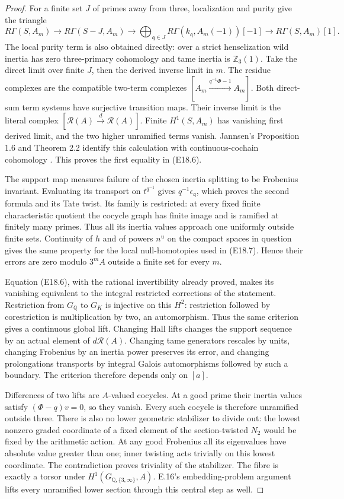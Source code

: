 \begin{proof}
For a finite set $J$ of primes away from three,
localization and purity give the triangle
\[
 R\Gamma(S,A_m)\longrightarrow
 R\Gamma(S-J,A_m)\longrightarrow
 \bigoplus_{\mathfrak q\in J}
 R\Gamma(k_{\mathfrak q},A_m(-1))[-1]
 \longrightarrow R\Gamma(S,A_m)[1].
 \tag{E18.7}
\]
The local purity term is also obtained directly:
over a strict henselization wild inertia has zero
three-primary cohomology and tame inertia is
$\mathbb Z_3(1)$. Take the direct limit over finite
$J$, then the derived inverse limit in $m$.
The residue complexes are the compatible two-term
complexes $[A_m\xrightarrow{q^{-1}\Phi-1}A_m]$.
Both direct-sum term systems have surjective
transition maps. Their inverse limit is the literal
complex $[\mathcal R(A)\xrightarrow d\mathcal R(A)]$.
Finite $H^1(S,A_m)$ has vanishing first derived
limit, and the two higher unramified terms vanish.
Jannsen's Proposition 1.6 and Theorem 2.2 identify
this calculation with continuous-cochain cohomology
\cite{Jannsen1988}. This proves the first equality
in (E18.6).

The support map measures failure of the chosen
inertia splitting to be Frobenius invariant.
Evaluating its transport on $t^{q^{-1}}$ gives
$q^{-1}\epsilon_{\mathfrak q}$, which proves the
second formula and its Tate twist. Its family is
restricted: at every fixed finite characteristic
quotient the cocycle graph has finite image and
is ramified at finitely many primes. Thus all its
inertia values approach one uniformly outside
finite sets. Continuity of $h$ and of powers
$n^u$ on the compact spaces in question gives
the same property for the local null-homotopies
used in (E18.7). Hence their errors are zero
modulo $3^mA$ outside a finite set for every $m$.

Equation (E18.6), with the rational invertibility
already proved, makes its vanishing equivalent
to the integral restricted corrections of the
statement. Restriction from $G_{\mathbb Q}$ to
$G_K$ is injective on this $H^2$: restriction
followed by corestriction is multiplication by
two, an automorphism. Thus the same criterion
gives a continuous global lift. Changing Hall
lifts changes the support sequence by an actual
element of $d\mathcal R(A)$. Changing tame
generators rescales by units, changing Frobenius
by an inertia power preserves its error, and
changing prolongations transports by integral
Galois automorphisms followed by such a boundary.
The criterion therefore depends only on $[a]$.

Differences of two lifts are $A$-valued cocycles.
At a good prime their inertia values satisfy
$(\Phi-q)v=0$, so they vanish. Every such
cocycle is therefore unramified outside three.
There is also no lower geometric stabilizer
to divide out: the lowest nonzero graded
coordinate of a fixed element of the
section-twisted $N_2$ would be fixed by the
arithmetic action. At any good Frobenius all
its eigenvalues have absolute value greater
than one; inner twisting acts trivially on
this lowest coordinate. The contradiction
proves triviality of the stabilizer. The fibre
is exactly a torsor under $H^1(G_{\mathbb Q,\{3,\infty\}},A)$.
E.16's embedding-problem argument lifts every
unramified lower section through this central
step as well.


\end{proof}
